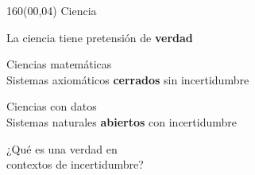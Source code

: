 \documentclass[shownotes,aspectratio=169]{beamer}
\begin{document}
\begin{frame}[plain]
\begin{textblock}{160}(00,04)
\centering
\LARGE Ciencia
\end{textblock}
\vspace{1cm} \Large

\centering

 La ciencia tiene pretensión de \textbf{verdad}

\vspace{0.8cm}

\pause

 \large Ciencias matemáticas \\
 \large Sistemas axiomáticos \textbf{cerrados} sin incertidumbre\\

 \vspace{0.3cm}

  \pause

\large Ciencias con datos  \\
\large Sistemas naturales \textbf{abiertos} con incertidumbre

\pause
\vspace{1cm}

\Large

¿Qué es una verdad en \\ contextos de incertidumbre?
%
%
%

\end{frame}
%
%
%
%
\end{document}
